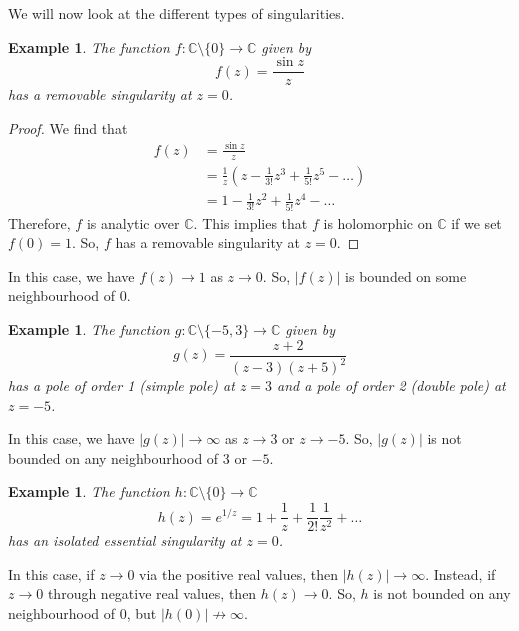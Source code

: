 \documentclass[a4paper, openany]{memoir}
\theoremstyle{definition}
\theoremstyle{plain}
\newtheorem{example}[definition]{Example}
\begin{document}
We will now look at the different types of singularities.
\begin{example}
The function $f: \mathbb{C} \setminus \{0\} \to \mathbb{C}$ given by
\[f(z) = \frac{\sin z}{z}\]
has a removable singularity at $z = 0$.
\end{example}
\begin{proof}
We find that
\begin{align*}
    f(z) &= \frac{\sin z}{z} \\
    &= \frac{1}{z} \left(z - \frac{1}{3!}z^3 + \frac{1}{5!} z^5 - \dots\right) \\
    &= 1 - \frac{1}{3!} z^2 + \frac{1}{5!} z^4 - \dots
\end{align*}
Therefore, $f$ is analytic over $\mathbb{C}$. This implies that $f$ is holomorphic on $\mathbb{C}$ if we set $f(0) = 1$. So, $f$ has a removable singularity at $z = 0$.
\end{proof}
\noindent In this case, we have $f(z) \to 1$ as $z \to 0$. So, $|f(z)|$ is bounded on some neighbourhood of $0$.
\begin{example}
The function $g: \mathbb{C} \setminus \{-5, 3\} \to \mathbb{C}$ given by
\[g(z) = \frac{z + 2}{(z - 3)(z + 5)^2}\]
has a pole of order 1 (simple pole) at $z = 3$ and a pole of order 2 (double pole) at $z = -5$.
\end{example}
\noindent In this case, we have $|g(z)| \to \infty$ as $z \to 3$ or $z \to -5$. So, $|g(z)|$ is not bounded on any neighbourhood of $3$ or $-5$.
\begin{example}
The function $h: \mathbb{C} \setminus \{0\} \to \mathbb{C}$
\[h(z) = e^{1/z} = 1  + \frac{1}{z} + \frac{1}{2!} \frac{1}{z^2} + \dots\]
has an isolated essential singularity at $z = 0$.
\end{example}
\noindent In this case, if $z \to 0$ via the positive real values, then $|h(z)| \to \infty$. Instead, if $z \to 0$ through negative real values, then $h(z) \to 0$. So, $h$ is not bounded on any neighbourhood of $0$, but $|h(0)| \not\to \infty$.
\end{document}
